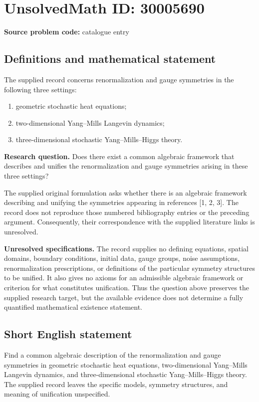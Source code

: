 \documentclass[11pt]{article}
\begin{document}
\section*{UnsolvedMath ID: 30005690}
\textbf{Source problem code:} catalogue entry
\subsection{Definitions and mathematical statement}
The supplied record concerns renormalization and gauge symmetries in the following three settings:
\begin{enumerate}
\item geometric stochastic heat equations;
\item two-dimensional Yang--Mills Langevin dynamics;
\item three-dimensional stochastic Yang--Mills--Higgs theory.
\end{enumerate}
\textbf{Research question.} Does there exist a common algebraic framework that describes and unifies the renormalization and gauge symmetries arising in these three settings?

The supplied original formulation asks whether there is an algebraic framework describing and unifying the symmetries appearing in references [1, 2, 3]. The record does not reproduce those numbered bibliography entries or the preceding argument. Consequently, their correspondence with the supplied literature links is unresolved.

\textbf{Unresolved specifications.} The record supplies no defining equations, spatial domains, boundary conditions, initial data, gauge groups, noise assumptions, renormalization prescriptions, or definitions of the particular symmetry structures to be unified. It also gives no axioms for an admissible algebraic framework or criterion for what constitutes unification. Thus the question above preserves the supplied research target, but the available evidence does not determine a fully quantified mathematical existence statement.
\subsection{Short English statement}
Find a common algebraic description of the renormalization and gauge symmetries in geometric stochastic heat equations, two-dimensional Yang--Mills Langevin dynamics, and three-dimensional stochastic Yang--Mills--Higgs theory. The supplied record leaves the specific models, symmetry structures, and meaning of unification unspecified.
\end{document}
